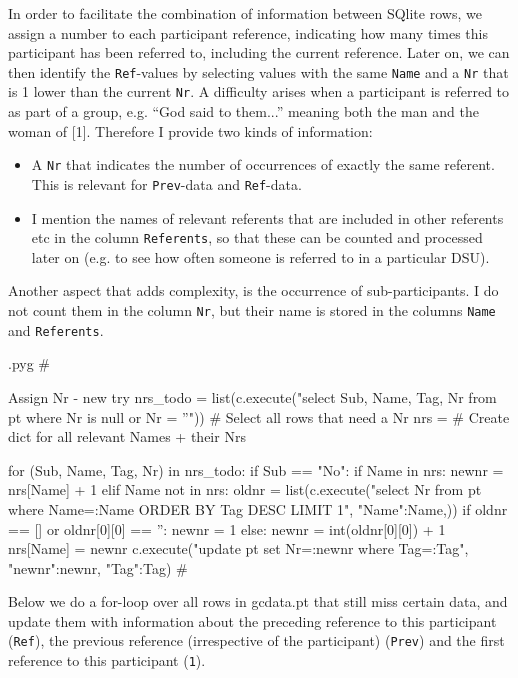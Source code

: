 \documentclass{report}
\makeatletter
\newcommand{\mi}[1]{\lstinline{#1}}
\newenvironment{python}{%
  \VerbatimEnvironment
  \minted@resetoptions
  \setkeys{minted@opt}{}
      \begin{VerbatimOut}{\jobname.pyg}}
{%
      \end{VerbatimOut}
      \minted@pygmentize{python}
      \DeleteFile{\jobname.pyg}}
\makeatother
\begin{document}
In order to facilitate the combination of information between SQlite rows,
we assign a number to each participant reference, indicating how many times
this participant has been referred to, including the current reference.
Later on, we can then identify the \mi{Ref}-values by selecting values with the
same \mi{Name} and a \mi{Nr} that is 1 lower than the current \mi{Nr}.
A difficulty arises when a participant is referred to as part of a group,
e.g. ``God said to them...'' meaning both the man and the woman of [1].
Therefore I provide two kinds of information:
\begin{itemize}
\item A \mi{Nr} that indicates the number of occurrences of exactly the same referent. This is relevant for \mi{Prev}-data and \mi{Ref}-data.
\item I mention the names of relevant referents that are included in other referents etc in the column \mi{Referents}, so that these can be counted and processed later on (e.g. to see how often someone is referred to in a particular DSU).
\end{itemize}
Another aspect that adds complexity, is the occurrence of sub-participants.
I do not count them in the column \mi{Nr}, but their name is stored in the columns
\mi{Name} and \mi{Referents}.


\begin{python}
#{{{ Assign Nr - new try
nrs_todo = list(c.execute("select Sub, Name, Tag, Nr from pt where Nr is null or Nr = ''"))  # Select all rows that need a Nr
nrs = {}    # Create dict for all relevant Names + their Nrs

for (Sub, Name, Tag, Nr) in nrs_todo:
    if Sub == "No":
        if Name in nrs:
            newnr = nrs[Name] + 1
        elif Name not in nrs:
            oldnr = list(c.execute("select Nr from pt where Name=:Name ORDER BY Tag DESC LIMIT 1", {"Name":Name,}))
            if oldnr == [] or oldnr[0][0] == '':
                newnr = 1
            else:
                newnr = int(oldnr[0][0]) + 1
        nrs[Name] = newnr
        c.execute("update pt set Nr=:newnr where Tag=:Tag", {"newnr":newnr, "Tag":Tag})
#}}}
\end{python}

Below we do a for-loop over all rows in gcdata.pt that still miss certain data,
and update them with information about the preceding reference to this participant (\mi{Ref}),
the previous reference (irrespective of the participant) (\mi{Prev}) and the first reference
to this participant (\mi{1}).
\end{document}

